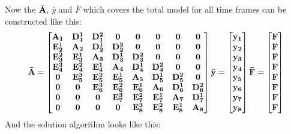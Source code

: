 \documentclass[letterpaper,10pt,english]{jupyterBook}
\begin{document}
\sphinxAtStartPar
Now the \(\bf{\bar A}\), \(\bar y\) and \(\bar F\) which covers the total model for all time frames can be constructed like this:
\begin{equation*}
\begin{split}\bf{\bar A} =\begin{bmatrix}
		\bf{A_1}   & \bf{D_1^1} & \bf{D_1^2} & \bf{0}     &\bf{0}      &\bf{0}      &\bf{0}      &\bf{0}  \\
        \bf{E_2^1} & \bf{A_2}   & \bf{D_2^1} & \bf{D_2^2} &\bf{0}      &\bf{0}      &\bf{0}      &\bf{0} \\
        \bf{E_3^2} & \bf{E_3^1} & \bf{A_3}   & \bf{D_3^1} & \bf{D_3^2} &\bf{0}      &\bf{0}      &\bf{0} \\
        \bf{E_4^3} & \bf{E_4^2} & \bf{E_4^1} & \bf{A_4}   & \bf{D_4^1} & \bf{D_4^2} &\bf{0}      & \bf{0} \\
        \bf{0}     & \bf{E_5^3} & \bf{E_5^2} & \bf{E_5^1} & \bf{A_5}   & \bf{D_5^1} & \bf{D_5^2} &\bf{0}\\
        \bf{0}     & \bf{0}     & \bf{E_6^3} & \bf{E_6^2} & \bf{E_6^1} & \bf{A_6}   & \bf{D_6^1} & \bf{D_6^2}\\
        \bf{0}     & \bf{0}     & \bf{0}     & \bf{E_7^3} & \bf{E_7^2} & \bf{E_7^1} & \bf{A_7}   & \bf{D_7^1} \\
        \bf{0}     & \bf{0}     & \bf{0}     & \bf{0}     & \bf{E_8^3} & \bf{E_8^2} & \bf{E_8^1} & \bf{A_8} \\
\end{bmatrix} \bar y = \begin{bmatrix}\bf{y_1}\\\bf{y_2}\\\bf{y_3}\\ \bf{y_4} \\\bf{y_5} \\\bf{y_6} \\ \bf{y_7} \\ \bf{y_8} \end{bmatrix} \bar F = \begin{bmatrix}\bf{F}\\\bf{F}\\\bf{F}\\ \bf{F} \\\bf{F} \\\bf{F} \\ \bf{F} \\ \bf{F} \end{bmatrix}\end{split}
\end{equation*}
\sphinxAtStartPar
And the solution algorithm looks like this:
\end{document}
